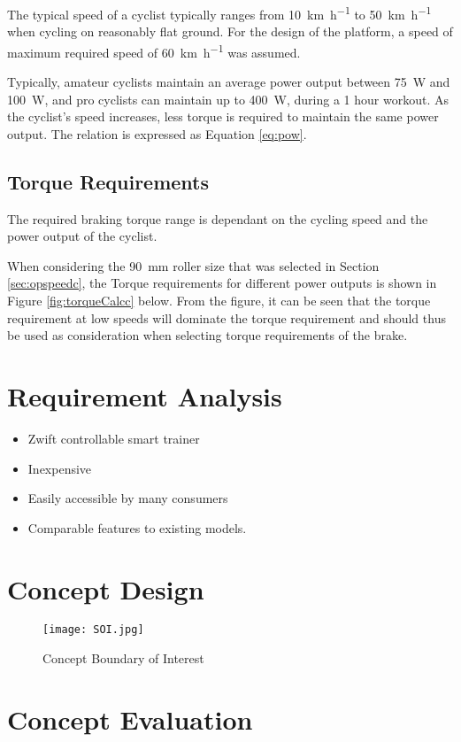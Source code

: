 The typical speed of a cyclist typically ranges from \SI{10}{\kilo\meter\per\hour} to \SI{50}{\kilo\meter\per\hour} when cycling on reasonably flat ground. For the design of the platform, a speed of maximum required speed of \SI{60}{\kilo\meter\per\hour} was assumed.

Typically, amateur cyclists maintain an average power output between \SI{75}{\watt} and \SI{100}{\watt}, and pro cyclists can maintain up to \SI{400}{\watt}, during a 1 hour workout. As the cyclist's speed increases, less torque is required to maintain the same power output. The relation is expressed as Equation \ref{eq:pow}.

\subsection{Torque Requirements}

The required braking torque range is dependant on the cycling speed and the power output of the cyclist.

When considering the \SI{90}{\milli\meter} roller size that was selected in Section \ref{sec:opspeedc}, the Torque requirements for different power outputs is shown in Figure \ref{fig:torqueCalcc} below. From the figure, it can be seen that the torque requirement at low speeds will dominate the torque requirement and should thus be used as consideration when selecting torque requirements of the brake.

\newpage

\section{Requirement Analysis}
\label{sec:req}

\begin{itemize}
	\item Zwift controllable smart trainer
	\item Inexpensive
	\item Easily accessible by many consumers
	\item Comparable features to existing models.
\end{itemize}

\section{Concept Design}
\label{sec:conc}


\begin{figure}[H]
	\begin{center}
		\texttt{[image: SOI.jpg]}
		\caption{Concept Boundary of Interest}
		\label{fig:soi}
	\end{center}
\end{figure}


\section{Concept Evaluation}
\label{sec:eval}